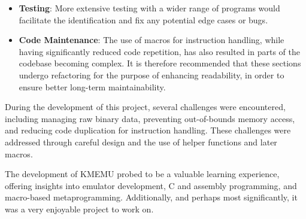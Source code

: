 \documentclass[12pt,a4paper]{paper}
\begin{document}
\begin{itemize}
    \item \textbf{Testing}: More extensive testing with a wider range of
        programs would facilitate the identification and fix any potential edge
        cases or bugs.
    \item \textbf{Code Maintenance}: The use of macros for instruction handling,
        while having significantly reduced code repetition, has also resulted in
        parts of the codebase becoming complex. It is therefore recommended that
        these sections undergo refactoring for the purpose of enhancing
        readability, in order to ensure better long-term maintainability.
\end{itemize}

During the development of this project, several challenges were encountered,
including managing raw binary data, preventing out-of-bounds memory access, and
reducing code duplication for instruction handling. These challenges were
addressed through careful design and the use of helper functions and later
macros.

The development of KMEMU probed to be a valuable learning experience, offering
insights into emulator development, C and assembly programming, and macro-based
metaprogramming. Additionally, and perhaps most significantly, it was a very
enjoyable project to work on.
\end{document}

